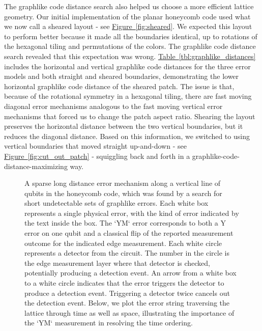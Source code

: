 \documentclass[onecolumn,unpublished,a4paper]{quantumarticle}
\theoremstyle{definition}
\theoremstyle{definition}
\theoremstyle{definition}
\newcommand{\fig}[1]{\hyperref[fig:#1]{Figure~\ref*{fig:#1}}}
\newcommand{\tbl}[1]{\hyperref[tbl:#1]{Table~\ref*{tbl:#1}}}
\begin{document}
The graphlike code distance search also helped us choose a more efficient lattice geometry.
Our initial implementation of the planar honeycomb code used what we now call a sheared layout - see \fig{sheared}.
We expected this layout to perform better because it made all the boundaries identical, up to rotations of the hexagonal tiling and permutations of the colors.
The graphlike code distance search revealed that this expectation was wrong.
\tbl{graphlike_distances} includes the horizontal and vertical graphlike code distances for the three error models and both straight and sheared boundaries, demonstrating the lower horizontal graphlike code distance of the sheared patch.
The issue is that, because of the rotational symmetry in a hexagonal tiling, there are fast moving diagonal error mechanisms analogous to the fast moving vertical error mechanisms that forced us to change the patch aspect ratio.
Shearing the layout preserves the horizontal distance between the two vertical boundaries, but it reduces the diagonal distance.
Based on this information, we switched to using vertical boundaries that moved straight up-and-down - see \fig{cut_out_patch} - squiggling back and forth in a graphlike-code-distance-maximizing way.

\begin{figure}[ht!]
    \centering
    \caption{
    A sparse long distance error mechanism along a vertical line of qubits in the honeycomb code, which was found by a search for short undetectable sets of graphlike errors.
    Each white box represents a single physical error, with the kind of error indicated by the text inside the box.
    The `YM` error corresponds to both a Y error on one qubit and a classical flip of the reported measurement outcome for the indicated edge measurement.
    Each white circle represents a detector from the circuit.
    The number in the circle is the edge measurement layer where that detector is checked, potentially producing a detection event.
    An arrow from a white box to a white circle indicates that the error triggers the detector to produce a detection event.
    Triggering a detector twice cancels out the detection event.  
    Below, we plot the error string traversing the lattice through time as well as space, illustrating the importance of the `YM` measurement in resolving the time ordering.
    }
    \label{fig:bad_error}
\end{figure}
\end{document}
